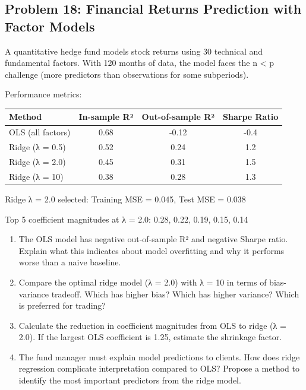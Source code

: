 \documentclass[12pt]{article}
\begin{document}
\subsection*{Problem 18: Financial Returns Prediction with Factor Models}

A quantitative hedge fund models stock returns using 30 technical and fundamental factors. With 120 months of data, the model faces the n < p challenge (more predictors than observations for some subperiods).

Performance metrics:

\begin{center}
\begin{tabular}{lccc}
\toprule
Method & In-sample R² & Out-of-sample R² & Sharpe Ratio \\
\midrule
OLS (all factors) & 0.68 & -0.12 & -0.4 \\
Ridge (λ = 0.5) & 0.52 & 0.24 & 1.2 \\
Ridge (λ = 2.0) & 0.45 & 0.31 & 1.5 \\
Ridge (λ = 10) & 0.38 & 0.28 & 1.3 \\
\bottomrule
\end{tabular}
\end{center}

Ridge λ = 2.0 selected: Training MSE = 0.045, Test MSE = 0.038

Top 5 coefficient magnitudes at λ = 2.0: 0.28, 0.22, 0.19, 0.15, 0.14

\begin{enumerate}[label=(\alph*)]
\item The OLS model has negative out-of-sample R² and negative Sharpe ratio. Explain what this indicates about model overfitting and why it performs worse than a naive baseline.

\item Compare the optimal ridge model (λ = 2.0) with λ = 10 in terms of bias-variance tradeoff. Which has higher bias? Which has higher variance? Which is preferred for trading?

\item Calculate the reduction in coefficient magnitudes from OLS to ridge (λ = 2.0). If the largest OLS coefficient is 1.25, estimate the shrinkage factor.

\item The fund manager must explain model predictions to clients. How does ridge regression complicate interpretation compared to OLS? Propose a method to identify the most important predictors from the ridge model.
\end{enumerate}
\end{document}
